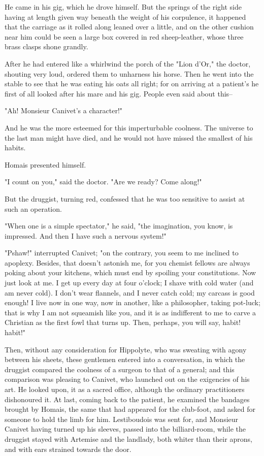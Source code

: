\documentclass[11pt,twocolumn]{ltugboat}
\begin{document}
He came in his gig, which he drove himself. But the springs of the right
side having at length given way beneath the weight of his corpulence, it
happened that the carriage as it rolled along leaned over a little, and
on the other cushion near him could be seen a large box covered in red
sheep-leather, whose three brass clasps shone grandly.

After he had entered like a whirlwind the porch of the "Lion d'Or," the
doctor, shouting very loud, ordered them to unharness his horse. Then he
went into the stable to see that he was eating his oats all right; for
on arriving at a patient's he first of all looked after his mare and his
gig. People even said about this--

"Ah! Monsieur Canivet's a character!"

And he was the more esteemed for this imperturbable coolness. The
universe to the last man might have died, and he would not have missed
the smallest of his habits.

Homais presented himself.

"I count on you," said the doctor. "Are we ready? Come along!"

But the druggist, turning red, confessed that he was too sensitive to
assist at such an operation.

"When one is a simple spectator," he said, "the imagination, you know,
is impressed. And then I have such a nervous system!"

"Pshaw!" interrupted Canivet; "on the contrary, you seem to me inclined
to apoplexy. Besides, that doesn't astonish me, for you chemist fellows
are always poking about your kitchens, which must end by spoiling your
constitutions. Now just look at me. I get up every day at four o'clock;
I shave with cold water (and am never cold). I don't wear flannels, and
I never catch cold; my carcass is good enough! I live now in one way,
now in another, like a philosopher, taking pot-luck; that is why I
am not squeamish like you, and it is as indifferent to me to carve a
Christian as the first fowl that turns up. Then, perhaps, you will say,
habit! habit!"

Then, without any consideration for Hippolyte, who was sweating with
agony between his sheets, these gentlemen entered into a conversation,
in which the druggist compared the coolness of a surgeon to that of a
general; and this comparison was pleasing to Canivet, who launched out
on the exigencies of his art. He looked upon, it as a sacred office,
although the ordinary practitioners dishonoured it. At last, coming back
to the patient, he examined the bandages brought by Homais, the same
that had appeared for the club-foot, and asked for someone to hold the
limb for him. Lestiboudois was sent for, and Monsieur Canivet having
turned up his sleeves, passed into the billiard-room, while the druggist
stayed with Artemise and the landlady, both whiter than their aprons,
and with ears strained towards the door.
\end{document}
